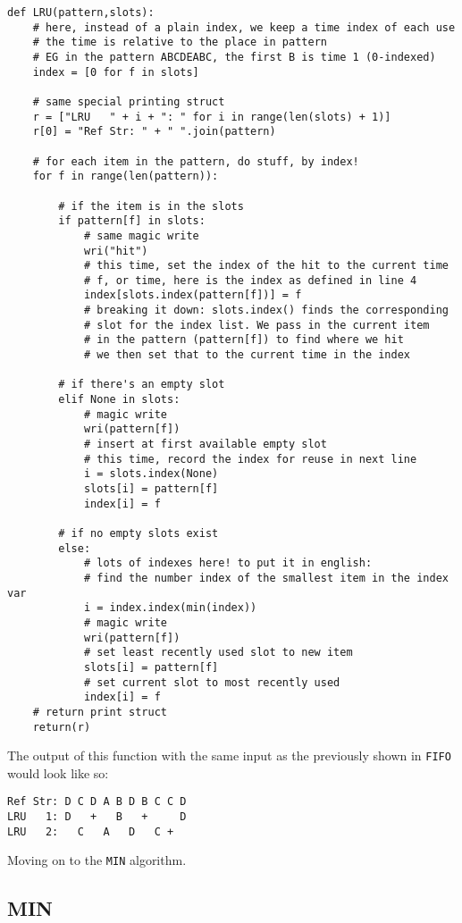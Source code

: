 \documentclass[11pt]{article}
\begin{document}
\begin{lstlisting}
def LRU(pattern,slots):
	# here, instead of a plain index, we keep a time index of each use
	# the time is relative to the place in pattern
	# EG in the pattern ABCDEABC, the first B is time 1 (0-indexed)
	index = [0 for f in slots]

	# same special printing struct
	r = ["LRU   " + i + ": " for i in range(len(slots) + 1)]
	r[0] = "Ref Str: " + " ".join(pattern)

	# for each item in the pattern, do stuff, by index!
	for f in range(len(pattern)):

		# if the item is in the slots
		if pattern[f] in slots:
			# same magic write
			wri("hit")
			# this time, set the index of the hit to the current time
			# f, or time, here is the index as defined in line 4
			index[slots.index(pattern[f])] = f
			# breaking it down: slots.index() finds the corresponding
			# slot for the index list. We pass in the current item
			# in the pattern (pattern[f]) to find where we hit
			# we then set that to the current time in the index

		# if there's an empty slot
		elif None in slots:
			# magic write
			wri(pattern[f])
			# insert at first available empty slot
			# this time, record the index for reuse in next line
			i = slots.index(None)
			slots[i] = pattern[f]
			index[i] = f

		# if no empty slots exist
		else:
			# lots of indexes here! to put it in english:
			# find the number index of the smallest item in the index var
			i = index.index(min(index))
			# magic write
			wri(pattern[f])
			# set least recently used slot to new item
			slots[i] = pattern[f]
			# set current slot to most recently used
			index[i] = f
	# return print struct
	return(r)

\end{lstlisting}

The output of this function with the same input as the previously shown in \texttt{FIFO} would look like so:
\vspace{-2em}

\begin{lstlisting}
Ref Str: D C D A B D B C C D
LRU   1: D   +   B   +     D
LRU   2:   C   A   D   C +
\end{lstlisting}

Moving on to the \texttt{MIN} algorithm.

\subsection{MIN}
\end{document}
